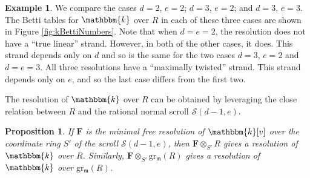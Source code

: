 \documentclass[12pt,reqno]{amsart}
\newtheorem{proposition}[theorem]{Proposition}
\theoremstyle{definition}
\newtheorem{example}[theorem]{Example}
\theoremstyle{remark}
\newcommand{\grm}{\operatorname{gr_\frakm}}
\newcommand{\grmR}{{\grm(R)}}
\newcommand{\bbk}{\mathbbm{k}}
\newcommand{\calS}{{\mathcal{S}}}
\newcommand{\frakm}{{\mathfrak{m}}}
\newcommand{\bfF}{{\mathbf{F}}}
\begin{document}
\begin{example}
  We compare the cases $d=2$,  $e=2$; $d=3$, $e=2$; and $d=3$, $e=3$.  The Betti tables for $\bbk$ over $R$ in each of these three cases are shown in Figure \ref{fig:kBettiNumbers}.  Note that when $d=e=2$, the resolution does not have a ``true linear'' strand.  However, in both of the other cases, it does.  This strand depends only on $d$ and so is the same for the two cases $d=3$, $e=2$ and $d=e=3$.  All three resolutions have a ``maximally twisted'' strand.  This strand  depends only on $e$, and so the last case differs from the first two.  
\end{example}

The resolution of $\bbk$ over $R$ can be obtained by leveraging the close relation between $R$ and the rational normal scroll $\calS(d-1,e)$. 

\begin{proposition}
If $\bfF$ is the minimal free resolution of $\bbk[v]$ over the coordinate ring $S'$ of the scroll $\calS(d-1,e)$, then $\bfF \otimes_{S'} R$ gives a resolution of $\bbk$ over $R$. Similarly, $\bfF \otimes_{S'} \grmR$ gives a resolution of $\bbk$ over $\grmR$.
\end{proposition}
\end{document}
